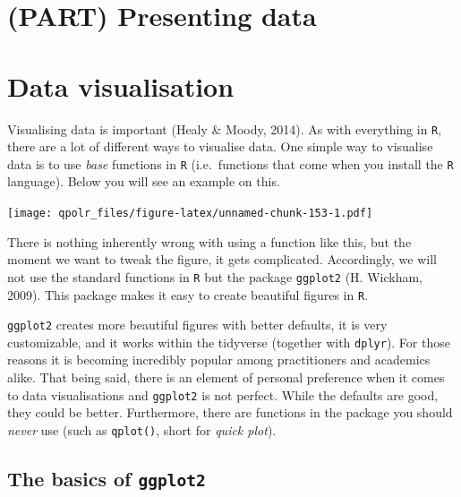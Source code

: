 \documentclass[12pt,oneside]{reedthesis}
\theoremstyle{definition}
\theoremstyle{definition}
\theoremstyle{definition}
\theoremstyle{remark}
\begin{document}
  \chapter*{(PART) Presenting data}\label{part-presenting-data}
  
  \chapter{Data visualisation}\label{dataviz}
  
  Visualising data is important (Healy \& Moody, 2014). As with everything
  in \texttt{R}, there are a lot of different ways to visualise data. One
  simple way to visualise data is to use \emph{base} functions in
  \texttt{R} (i.e.~functions that come when you install the \texttt{R}
  language). Below you will see an example on this.
  \begin{Shaded}
  \begin{Highlighting}[]
  \NormalTok{(}\OperatorTok{$}\OperatorTok{$}
  \end{Highlighting}
  \end{Shaded}
  \texttt{[image: qpolr\_files/figure-latex/unnamed-chunk-153-1.pdf]}
  
  There is nothing inherently wrong with using a function like this, but
  the moment we want to tweak the figure, it gets complicated.
  Accordingly, we will not use the standard functions in \texttt{R} but
  the package \texttt{ggplot2} (H. Wickham, 2009). This package makes it
  easy to create beautiful figures in \texttt{R}.
  
  \texttt{ggplot2} creates more beautiful figures with better defaults, it
  is very customizable, and it works within the tidyverse (together with
  \texttt{dplyr}). For those reasons it is becoming incredibly popular
  among practitioners and academics alike. That being said, there is an
  element of personal preference when it comes to data visualisations and
  \texttt{ggplot2} is not perfect. While the defaults are good, they could
  be better. Furthermore, there are functions in the package you should
  \emph{never} use (such as \texttt{qplot()}, short for \emph{quick
  plot}).
  
  \section{\texorpdfstring{The basics of
  \texttt{ggplot2}}{The basics of ggplot2}}\label{the-basics-of-ggplot2}
  
\end{document}
